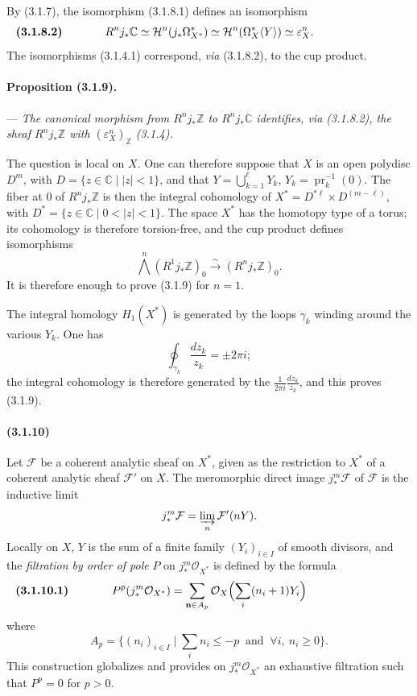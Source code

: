 \documentclass[10pt]{article}
\newcommand{\C}{\mathbb C}
\newcommand{\Z}{\mathbb Z}
\providecommand{\cO}{\mathcal O}
\providecommand{\cO}{\mathcal O}
\begin{document}
By (3.1.7), the isomorphism (3.1.8.1) defines an isomorphism
\[
\makebox[\textwidth][s]{\textbf{(3.1.8.2)}\hfill$\displaystyle R^nj_*\C\simeq \mathcal H^n(j_*\Omega_{X^*}^*)\simeq \mathcal H^n(\Omega_X^*\langle Y\rangle)\simeq \varepsilon_X^n.$\hfill\phantom{\textbf{(3.1.8.2)}}}
\]
The isomorphisms (3.1.4.1) correspond, \emph{via} (3.1.8.2), to the cup product.

\paragraph{Proposition (3.1.9).} --- {\itshape The canonical morphism from $R^nj_*\Z$ to $R^nj_*\C$ identifies, via (3.1.8.2), the sheaf $R^nj_*\Z$ with $(\varepsilon_X^n)_\Z$ (3.1.4).}

The question is local on $X$. One can therefore suppose that $X$ is an open polydisc $D^m$, with $D=\{z\in\C\mid |z|<1\}$, and that $Y=\bigcup_{k=1}^{\ell}Y_k$, $Y_k=\operatorname{pr}_k^{-1}(0)$. The fiber at $0$ of $R^nj_*\Z$ is then the integral cohomology of $X^*=D^{*\ell}\times D^{(m-\ell)}$, with $D^*=\{z\in\C\mid 0<|z|<1\}$.
The space $X^*$ has the homotopy type of a torus; its cohomology is therefore torsion-free, and the cup product defines isomorphisms
\[
\bigwedge^n(R^1j_*\Z)_0\xrightarrow{\sim}(R^nj_*\Z)_0.
\]
It is therefore enough to prove (3.1.9) for $n=1$.

The integral homology $H_1(X^*)$ is generated by the loops $\gamma_k$ winding around the various $Y_k$. One has
\[
\oint_{\gamma_k}\frac{dz_k}{z_k}=\pm2\pi i;
\]
the integral cohomology is therefore generated by the $\frac1{2\pi i}\frac{dz_k}{z_k}$, and this proves (3.1.9).

\paragraph{(3.1.10)} Let $\mathcal F$ be a coherent analytic sheaf on $X^*$, given as the restriction to $X^*$ of a coherent analytic sheaf $\mathcal F'$ on $X$. The meromorphic direct image $j_*^m\mathcal F$ of $\mathcal F$ is the inductive limit
\[
j_*^m\mathcal F=\varinjlim_n \mathcal F'(nY).
\]
Locally on $X$, $Y$ is the sum of a finite family $(Y_i)_{i\in I}$ of smooth divisors, and the \emph{filtration by order of pole} $P$ on $j_*^m\cO_{X^*}$ is defined by the formula
\[
\makebox[\textwidth][s]{\textbf{(3.1.10.1)}\hfill$\displaystyle P^p(j_*^m\cO_{X^*})=\sum_{\mathbf n\in A_p}\cO_X\Bigl(\sum_i(n_i+1)Y_i\Bigr)$\hfill\phantom{\textbf{(3.1.10.1)}}}
\]
where
\[
A_p=\{(n_i)_{i\in I}\mid \sum_i n_i\le -p\ \text{ and }\ \forall i,\ n_i\ge0\}.
\]
This construction globalizes and provides on $j_*^m\cO_{X^*}$ an exhaustive filtration such that $P^p=0$ for $p>0$.
\end{document}
